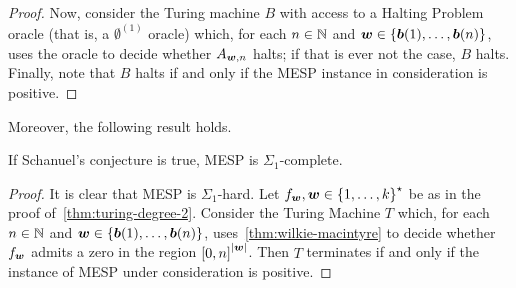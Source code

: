 \begin{proof}
Now, consider the Turing machine $B$ with access to a Halting Problem oracle (that is, a $\emptyset^{(1)}$ oracle) which, for each $n \in \mathbb{N}$ and $\boldsymbol{w} \in \lbrace \boldsymbol{b}(1), \ldots, \boldsymbol{b}(n) \rbrace$, uses the oracle to decide whether $A_{\boldsymbol{w}, n}$ halts; if that is ever not the case, $B$ halts. Finally, note that $B$ halts if and only if the MESP instance in consideration is positive.
\end{proof}

Moreover, the following result holds.

\begin{theorem}
  If Schanuel's conjecture is true, MESP is $\Sigma_{1}$-complete.
\end{theorem}

\begin{proof}
  It is clear that MESP is $\Sigma_{1}$-hard.
  Let $f_{\boldsymbol{w}}, \boldsymbol{w} \in {\lbrace 1, \ldots, k \rbrace}^{\star}$ be as in the proof of~\cref{thm:turing-degree-2}.
  Consider the Turing Machine $T$ which, for each $n \in \mathbb{N}$ and $\boldsymbol{w} \in \lbrace \boldsymbol{b}(1), \ldots, \boldsymbol{b}(n) \rbrace$, uses~\cref{thm:wilkie-macintyre} to decide whether $f_{\boldsymbol{w}}$ admits a zero in the region ${[0,n]}^{\lvert \boldsymbol{w} \rvert}$.
  Then $T$ terminates if and only if the instance of MESP under consideration is positive.
\end{proof}
